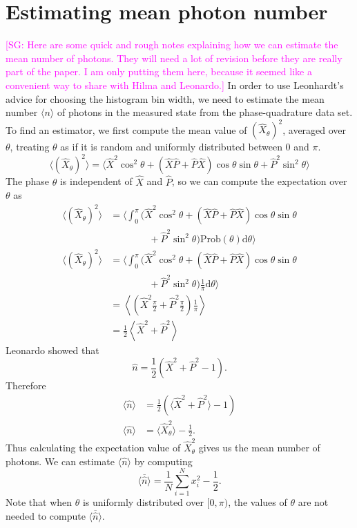 \documentclass[
reprint,
superscriptaddress,
showpacs,
amsmath,
amssymb,
aps,
pra,
longbibliography
]{revtex4-1}
\providecommand{\aucmnt}[1]{#1}
\providecommand{\aucmnt}[1]{}
\newcommand{\SGc}[1]{\aucmnt{\textcolor{magenta}{[SG: #1]}}}
\begin{document}
\section{Estimating mean photon number}
\label{sec-photon-estimation}
\SGc{Here are some quick and rough notes explaining how we can
  estimate the mean number of photons.  They will need a lot of
  revision before they are really part of the paper.  I am only
  putting them here, because it seemed like a convenient way to share
  with Hilma and Leonardo.}  In order to use Leonhardt's advice for
choosing the histogram bin width, we need to estimate the mean number
$\langle n \rangle$ of photons in the measured state from the
phase-quadrature data set.  To find an estimator, we first compute the
mean value of $(\hat{X}_{\theta})^{2}$, averaged over $\theta$, treating
$\theta$ as if it is random and uniformly distributed between $0$ and
$\pi$.
\begin{equation}
\langle (\hat{X}_{\theta})^{2} \rangle = \langle \hat{X}^{2}\cos^{2}\theta + (\hat{X}\hat{P}+\hat{P}\hat{X})\cos\theta\sin\theta + \hat{P}^{2}\sin^{2}\theta \rangle
\end{equation}
The phase $\theta$ is independent of $\hat{X}$ and $\hat{P}$, so we can compute the expectation over $\theta$ as
\begin{align}
\langle (\hat{X}_{\theta})^{2} \rangle &= \Big\langle \int_{0}^{\pi} (\hat{X}^{2}\cos^{2}\theta + (\hat{X}\hat{P}+\hat{P}\hat{X})\cos\theta\sin\theta \nonumber \\
 & \qquad \qquad + \hat{P}^{2}\sin^{2}\theta) \mathrm{Prob}(\theta) \mathrm{d}\theta \Big\rangle \\
\langle (\hat{X}_{\theta})^{2} \rangle &= \Big\langle \int_{0}^{\pi} (\hat{X}^{2}\cos^{2}\theta + (\hat{X}\hat{P}+\hat{P}\hat{X})\cos\theta\sin\theta \nonumber \\
 & \qquad \qquad + \hat{P}^{2}\sin^{2}\theta) \frac{1}{\pi} \mathrm{d}\theta \Big\rangle \\
 &= \left\langle (\hat{X}^{2}\frac{\pi}{2} + \hat{P}^{2}\frac{\pi}{2})\frac{1}{\pi} \right\rangle \\
 &= \frac{1}{2}\left\langle \hat{X}^{2} + \hat{P}^{2} \right\rangle
\end{align}
Leonardo showed that
\begin{equation}
\hat{n} = \frac{1}{2}\left(\hat{X}^{2}+\hat{P}^{2}-1\right).
\end{equation}
Therefore
\begin{align}
\langle\hat{n}\rangle &= \frac{1}{2}\left(\langle\hat{X}^{2}+\hat{P}^{2}\rangle-1\right) \\
\langle\hat{n}\rangle &= \langle \hat{X}_{\theta}^{2}\rangle-\frac{1}{2}. 
\end{align}
Thus calculating the expectation value of $\hat{X}_{\theta}^{2}$ gives us the mean number of photons.  We can estimate $\langle \hat{n} \rangle$ by computing
\begin{equation}
\overline{\langle \hat{n} \rangle} = \frac{1}{N} \sum_{i=1}^{N}x_{i}^{2} - \frac{1}{2}.
\label{eq-photon-estimation}
\end{equation}
Note that when $\theta$ is uniformly distributed over $[0,\pi)$, the values of $\theta$ are not needed to compute $\overline{\langle \hat{n} \rangle}$.
\end{document}

